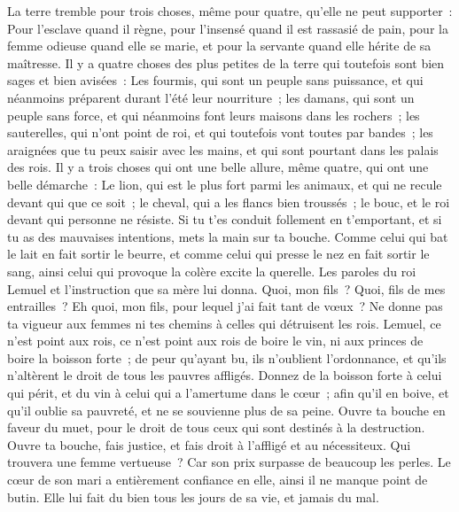 \begin{multicols}{2}
La terre tremble pour trois choses, même pour quatre, qu'elle ne peut supporter~:
Pour l'esclave quand il règne, pour l'insensé quand il est rassasié de pain,
pour la femme odieuse quand elle se marie, et pour la servante quand elle hérite de sa maîtresse.
Il y a quatre choses des plus petites de la terre qui toutefois sont bien sages et bien avisées~:
Les fourmis, qui sont un peuple sans puissance, et qui néanmoins préparent durant l'été leur nourriture~;
les damans, qui sont un peuple sans force, et qui néanmoins font leurs maisons dans les rochers~;
les sauterelles, qui n'ont point de roi, et qui toutefois vont toutes par bandes~;
les araignées que tu peux saisir avec les mains, et qui sont pourtant dans les palais des rois.
Il y a trois choses qui ont une belle allure, même quatre, qui ont une belle démarche~:
Le lion, qui est le plus fort parmi les animaux, et qui ne recule devant qui que ce soit~;
le cheval, qui a les flancs bien troussés~; le bouc, et le roi devant qui personne ne résiste.
Si tu t'es conduit follement en t'emportant, et si tu as des mauvaises intentions, mets la main sur ta bouche.
Comme celui qui bat le lait en fait sortir le beurre, et comme celui qui presse le nez en fait sortir le sang, ainsi celui qui provoque la colère excite la querelle.
\VerseOne{}Les paroles du roi Lemuel et l'instruction que sa mère lui donna.
Quoi, mon fils~? Quoi, fils de mes entrailles~? Eh quoi, mon fils, pour lequel j'ai fait tant de vœux~?
Ne donne pas ta vigueur aux femmes ni tes chemins à celles qui détruisent les rois.
Lemuel, ce n'est point aux rois, ce n'est point aux rois de boire le vin, ni aux princes de boire la boisson forte~;
de peur qu'ayant bu, ils n'oublient l'ordonnance, et qu'ils n'altèrent le droit de tous les pauvres affligés.
Donnez de la boisson forte à celui qui périt, et du vin à celui qui a l'amertume dans le cœur~;
afin qu'il en boive, et qu'il oublie sa pauvreté, et ne se souvienne plus de sa peine.
Ouvre ta bouche en faveur du muet, pour le droit de tous ceux qui sont destinés à la destruction.
Ouvre ta bouche, fais justice, et fais droit à l'affligé et au nécessiteux.
 Qui trouvera une femme vertueuse~? Car son prix surpasse de beaucoup les perles.
 Le cœur de son mari a entièrement confiance en elle, ainsi il ne manque point de butin.
 Elle lui fait du bien tous les jours de sa vie, et jamais du mal.

\end{multicols}
